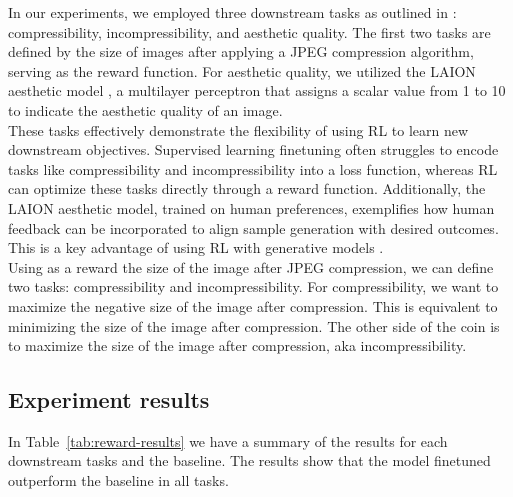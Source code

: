 In our experiments, we employed three downstream tasks as outlined in \citet{black2023training}: compressibility, incompressibility, and aesthetic quality. The first two tasks are defined by the size of images after applying a JPEG compression algorithm, serving as the reward function. For aesthetic quality, we utilized the LAION aesthetic model \citep{laionaesthetic}, a multilayer perceptron that assigns a scalar value from 1 to 10 to indicate the aesthetic quality of an image. \\


These tasks effectively demonstrate the flexibility of using RL to learn new downstream objectives. Supervised learning finetuning often struggles to encode tasks like compressibility and incompressibility into a loss function, whereas RL can optimize these tasks directly through a reward function. Additionally, the LAION aesthetic model, trained on human preferences, exemplifies how human feedback can be incorporated to align sample generation with desired outcomes. This is a key advantage of using RL with generative models \citep{ouyang2022training}. \\


 Using as a reward the size of the image after JPEG compression, we can 
 define two tasks: compressibility and incompressibility. For compressibility,
 we want to maximize the negative size of the image after compression. This
is equivalent to minimizing the size of the image after compression. 
The other side of the coin is to maximize the size of the image after compression, aka incompressibility. \\
  
 \subsection{Experiment results}

In Table~\ref{tab:reward-results} we have a summary of the results for each
downstream tasks and the baseline. The results show that the model finetuned
outperform the baseline in all tasks. 

